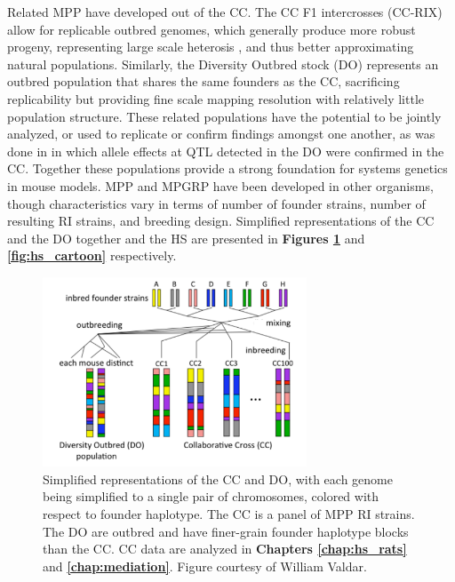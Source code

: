 Related MPP have developed out of the CC. The CC F1 intercrosses (CC-RIX) \citep{Rasmussen2014,Graham2015} allow for replicable outbred genomes, which generally produce more robust progeny, representing large scale heterosis \citep{Birchler2006}, and thus better approximating natural populations. Similarly, the Diversity Outbred stock (DO) \citep{Churchill2012,Svenson2012,Gatti2014} represents an outbred population that shares the same founders as the CC, sacrificing replicability but providing fine scale mapping resolution with relatively little population structure. These related populations have the potential to be jointly analyzed, or used to replicate or confirm findings amongst one another, as was done in \cite{Chick2016} in which allele effects at QTL detected in the DO were confirmed in the CC. Together these populations provide a strong foundation for systems genetics in mouse models. MPP and MPGRP have been developed in other organisms, though characteristics vary in terms of number of founder strains, number of resulting RI strains, and breeding design. Simplified representations of the CC and the DO together and the HS are presented in \textbf{Figures \ref{fig:intro_mpp_crosses}} and \textbf{\ref{fig:hs_cartoon}} respectively.

\begin{figure}
\centering
\includegraphics[width=0.7\textwidth, trim={0in 0in 0in 0in}, clip]{figures/1-introduction/cc_and_do.pdf}
\caption[Simplified depiction of the Collaborative Cross and Diversity Outbred stock in mice]{Simplified representations of the CC and DO, with each genome being simplified to a single pair of chromosomes, colored with respect to founder haplotype. The CC is a panel of MPP RI strains. The DO are outbred and have finer-grain founder haplotype blocks than the CC. CC data are analyzed in \textbf{Chapters \ref{chap:hs_rats}} and \textbf{\ref{chap:mediation}}. Figure courtesy of William Valdar. \label{fig:intro_mpp_crosses}}
\end{figure}

